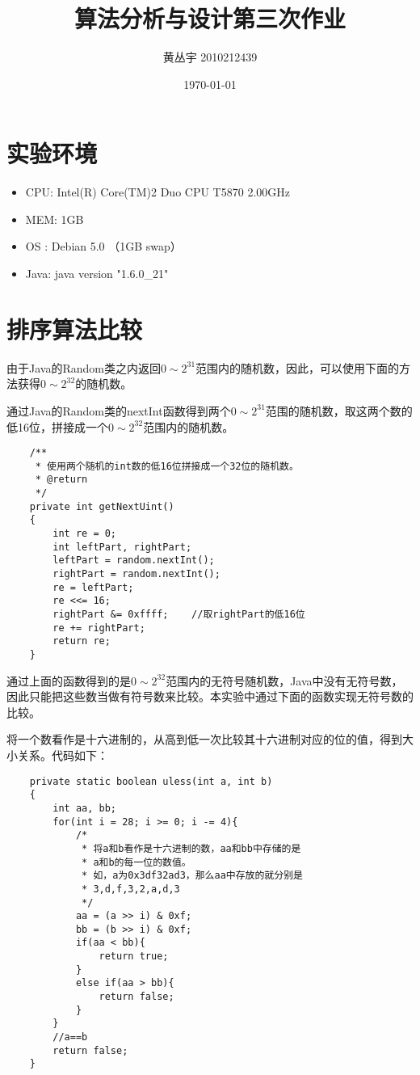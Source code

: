 \documentclass[a4paper, 11pt]{article}
\begin{document}
\title{{\Huge 算法分析与设计第三次作业\\}}
\author{黄丛宇 2010212439}
\date{\today}

\maketitle

\section{实验环境}
\begin{itemize}
	\item CPU: Intel(R) Core(TM)2 Duo CPU T5870 2.00GHz
	\item MEM: 1GB
	\item OS : Debian 5.0 （1GB swap）
	\item Java: java version "1.6.0\_21"
\end{itemize}
\section{排序算法比较}

由于Java的Random类之内返回$0 \sim 2 ^ {31}$范围内的随机数，因此，可以使用下面的方法获得$0 \sim 2 ^ {32}$的随机数。

通过Java的Random类的nextInt函数得到两个$0 \sim 2 ^ {31}$范围的随机数，取这两个数的低16位，拼接成一个$0 \sim 2 ^ {32}$范围内的随机数。
\begin{lstlisting}
	/**
	 * 使用两个随机的int数的低16位拼接成一个32位的随机数。
	 * @return
	 */
	private int getNextUint()
	{
		int re = 0;
		int leftPart, rightPart;
		leftPart = random.nextInt();
		rightPart = random.nextInt();
		re = leftPart;
		re <<= 16;
		rightPart &= 0xffff;	//取rightPart的低16位
		re += rightPart;
		return re;
	}
\end{lstlisting}

通过上面的函数得到的是$0 \sim 2 ^ {32}$范围内的无符号随机数，Java中没有无符号数，因此只能把这些数当做有符号数来比较。本实验中通过下面的函数实现无符号数的比较。

将一个数看作是十六进制的，从高到低一次比较其十六进制对应的位的值，得到大小关系。代码如下：
\begin{lstlisting}
	private static boolean uless(int a, int b)
	{
		int aa, bb;
		for(int i = 28; i >= 0; i -= 4){
			/*
			 * 将a和b看作是十六进制的数，aa和bb中存储的是
			 * a和b的每一位的数值。
			 * 如，a为0x3df32ad3，那么aa中存放的就分别是
			 * 3,d,f,3,2,a,d,3
			 */
			aa = (a >> i) & 0xf;
			bb = (b >> i) & 0xf;
			if(aa < bb){
				return true;
			}
			else if(aa > bb){
				return false;
			}
		}
		//a==b
		return false;
	}
\end{lstlisting}
\end{document}
